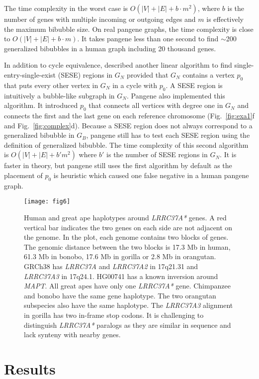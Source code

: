 \documentclass[webpdf,contemporary,large,namedate]{oup-authoring-template}%
\begin{document}
The time complexity in the worst case is $O(|V|+|E|+b\cdot m^2)$, where $b$ is the number of genes with multiple incoming or outgoing edges
and $m$ is effectively the maximum bibubble size.
On real pangene graphs, the time complexity is close to $O(|V|+|E|+b\cdot m)$.
It takes pangene less than one second to find $\sim$200 generalized bibubbles
in a human graph including 20 thousand genes.

In addition to cycle equivalence, \citet{DBLP:conf/pldi/JohnsonPP94}
described another linear algorithm to find single-entry-single-exist (SESE) regions in $G_N$
provided that $G_N$ contains a vertex $p_0$ that puts every other vertex in $G_N$ in a cycle with $p_0$.
A SESE region is intuitively a bubble-like subgraph in $G_N$.
Pangene also implemented this algorithm.
It introduced $p_0$ that connects all vertices with degree one in $G_N$
and connects the first and the last gene on each reference chromosome (Fig.~\ref{fig:exa1}f and Fig.~\ref{fig:complex}d).
Because a SESE region does not always correspond to a generalized bibubble in $G_B$,
pangene still has to test each SESE region using the definition of generalized bibubble.
The time complexity of this second algorithm is $O(|V|+|E|+b'm^2)$ where $b'$ is the number of
SESE regions in $G_N$.
It is faster in theory,
but pangene still uses the first algorithm by default
as the placement of $p_0$ is heuristic which caused one false negative in a human pangene graph.

\begin{figure*}[b!]
\centering
\texttt{[image: fig6]}
\caption{Human and great ape haplotypes around \emph{LRRC37A*} genes.
A red vertical bar indicates the two genes on each side are not adjacent on the genome.
In the plot, each genome contains two blocks of genes.
The genomic distance between the two blocks is 17.3 Mb in human, 61.3 Mb in bonobo,
17.6 Mb in gorilla or 2.8 Mb in orangutan.
GRCh38 has \emph{LRRC37A} and \emph{LRRC37A2} in 17q21.31 and \emph{LRRC37A3} in 17q24.1.
HG00741 has a known inversion around \emph{MAPT}.
All great apes have only one \emph{LRRC37A*} gene.
Chimpanzee and bonobo have the same gene haplotype.
The two orangutan subspecies also have the same haplotype.
The \emph{LRRC37A3} alignment in gorilla has two in-frame stop codons.
It is challenging to distinguish \emph{LRRC37A*} paralogs
as they are similar in sequence and lack synteny with nearby genes.
}\label{fig:17inv}
\end{figure*}

\section{Results}
\end{document}
